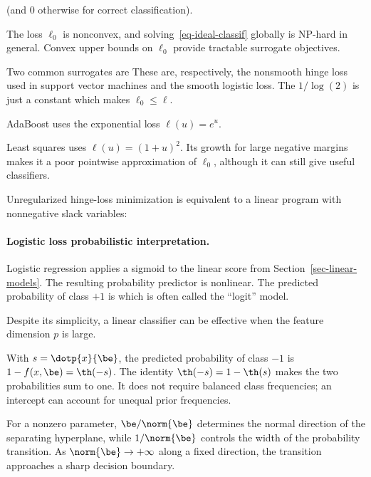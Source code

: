  (and 0 otherwise for correct classification).

The loss $\ell_0$ is nonconvex, and solving~\eqref{eq-ideal-classif} globally is NP-hard in general. Convex upper bounds on $\ell_0$ provide tractable surrogate objectives.

Two common surrogates are
These are, respectively, the nonsmooth hinge loss used in support vector machines and the smooth logistic loss. The $1/\log(2)$ is just a constant which makes $\ell_0 \leq \ell$.
  
AdaBoost uses the exponential loss $\ell(u)=e^u$.
 
Least squares uses $\ell(u)=(1+u)^2$. Its growth for large negative margins makes it a poor pointwise approximation of $\ell_0$, although it can still give useful classifiers.
  
Unregularized hinge-loss minimization is equivalent to a linear program with nonnegative slack variables:


    
\paragraph{Logistic loss probabilistic interpretation.}

Logistic regression applies a sigmoid to the linear score from Section~\ref{sec-linear-models}. The resulting probability predictor is nonlinear. The predicted probability of class $+1$ is
which is often called the ``logit'' model.
 
Despite its simplicity, a linear classifier can be effective when the feature dimension $p$ is large.
 
With $s=\dotp{x}{\be}$, the predicted probability of class $-1$ is $1-f(x,\be)=\th(-s)$. The identity $\th(-s)=1-\th(s)$ makes the two probabilities sum to one. It does not require balanced class frequencies; an intercept can account for unequal prior frequencies.

For a nonzero parameter, $\be/\norm{\be}$ determines the normal direction of the separating hyperplane, while $1/\norm{\be}$ controls the width of the probability transition. As $\norm{\be} \rightarrow +\infty$ along a fixed direction, the transition approaches a sharp decision boundary.

